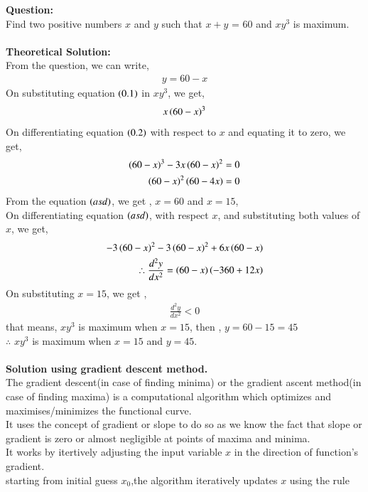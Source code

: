 \documentclass[journal]{IEEEtran}
\begin{document}
\textbf{Question:}
\\
Find two positive numbers $x$ and $y$ such that $x + y$ = 60 and $xy^3$ is maximum.\\
\\
\textbf{ Theoretical Solution: }
\\
From the question, we can write,
\begin{align}
        y = 60 - x
\end{align}
On substituting equation $\left(0.1\right)$ in $xy^3$, we get,
\begin{align}
    x\left(60 - x\right)^3
\end{align}
On differentiating equation $\left(0.2\right)$ with respect to $x$ and equating it to zero, we get,
\begin{align}
    \left(60 - x\right)^3 - 3x\left(60 - x\right)^2 = 0\\
    \left(60 - x\right)^2\left(60 - 4x\right) = 0
\end{align}
From the equation $\left(asd\right)$, we get , $x = 60$ and $x = 15$,\\
On differentiating equation $\left(asd\right)$, with respect $x$, and substituting both values of $x$, we get,
\begin{align}
    -3\left(60 - x\right)^2 -3\left(60 - x\right)^2 + 6x\left(60 - x\right)\\
    \therefore \frac{d^2y}{dx^2} = \left(60 - x\right)\left(-360 + 12x\right)
\end{align}
On substituting $x = 15$, we get ,
\begin{align}
    \frac{d^2y}{dx^2} < 0 
\end{align}
that means, $xy^3$ is maximum when $x = 15$, then , $y = 60 - 15=45$\\
$\therefore$ $xy^3$ is maximum when $x = 15$ and $ y = 45$.\\
\\ 
\textbf{Solution using gradient descent method.}
\\
The gradient descent(in case of finding minima) or the gradient ascent method(in case of finding maxima) is a computational algorithm which optimizes and maximises/minimizes the functional curve.\\
It uses the concept of gradient or slope to do so as we know the fact that slope or gradient is zero or almost negligible at points of maxima and minima.\\
It works by itertively adjusting the input variable $x$ in the direction of function's gradient.\\
starting from initial guess $x_0$,the algorithm iteratively updates $x$ using the rule\\
\end{document}
